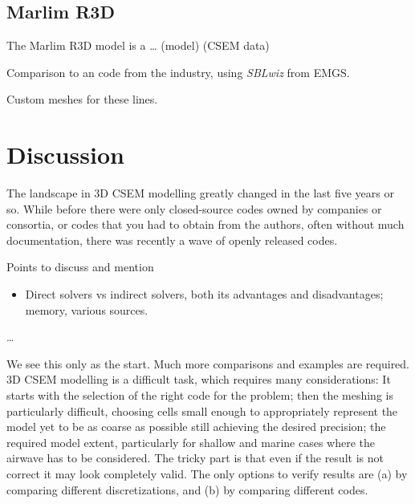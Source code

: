 \documentclass[
    paper,
  ]{geophysics}
\begin{document}
%
%

%
%

%
%


\subsection{Marlim R3D}

The Marlim R3D model is a \dots \cite{BJG.17.Carvalho} (model)
\cite{GEO.19.Correa} (CSEM data)

Comparison to an code from the industry, using \emph{SBLwiz} from EMGS.

Custom meshes for these lines.



\clearpage  %
\section{Discussion}

The landscape in 3D CSEM modelling greatly changed in the last five years or
so. While before there were only closed-source codes owned by companies or
consortia, or codes that you had to obtain from the authors, often
without much documentation, there was recently a wave of openly released codes.


Points to discuss and mention
\begin{itemize}
  \item Direct solvers vs indirect solvers, both its advantages and
    disadvantages; memory, various sources.
\end{itemize}

\dots

We see this only as the start. Much more comparisons and examples are required.
3D CSEM modelling is a difficult task, which requires many considerations: It
starts with the selection of the right code for the problem; then the meshing
is particularly difficult, choosing cells small enough to appropriately
represent the model yet to be as coarse as possible still achieving the desired
precision; the required model extent, particularly for shallow and marine cases
where the airwave has to be considered. The tricky part is that even if the
result is not correct it may look completely valid. The only options to verify
results are (a) by comparing different discretizations, and (b) by comparing
different codes.
\end{document}
